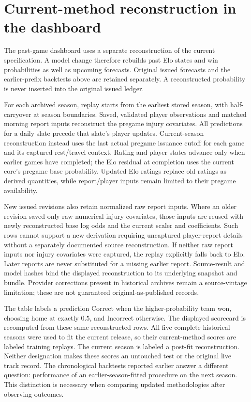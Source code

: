 \documentclass[11pt]{article}
\begin{document}
\section{Current-method reconstruction in the dashboard}
The past-game dashboard uses a separate reconstruction of the current
specification. A model change therefore rebuilds past Elo states and win
probabilities as well as upcoming forecasts. Original issued forecasts and
the earlier-prefix backtests above are retained separately. A reconstructed
probability is never inserted into the original issued ledger.

For each archived season, replay starts from the earliest stored season,
with half-carryover at season boundaries. Saved, validated player
observations and matched morning report inputs reconstruct the pregame
injury covariates. All predictions for a daily slate precede that slate's
player updates. Current-season reconstruction instead uses the last actual
pregame issuance cutoff for each game and its captured rest/travel context.
Rating and player states advance only when earlier games have completed;
the Elo residual at completion uses the current core's pregame base
probability. Updated Elo ratings replace old ratings as derived quantities,
while report/player inputs remain limited to their pregame availability.

New issued revisions also retain normalized raw report inputs. Where an
older revision saved only raw numerical injury covariates, those inputs
are reused with newly reconstructed base log odds and the current scaler
and coefficients. Such rows cannot support a new derivation requiring
uncaptured player-report details without a separately documented source
reconstruction. If neither raw report inputs nor injury covariates were
captured, the replay explicitly falls back to Elo. Later reports are never
substituted for a missing earlier report. Source-result and model hashes
bind the displayed reconstruction to its underlying snapshot and bundle.
Provider corrections present in historical archives remain a source-vintage
limitation; these are not guaranteed original-as-published records.

The table labels a prediction Correct when the higher-probability team
won, choosing home at exactly $0.5$, and Incorrect otherwise. The displayed
scorecard is recomputed from these same reconstructed rows. All five
complete historical seasons were used to fit the current release, so their
current-method scores are labeled training replays. The current season is
labeled a post-fit reconstruction. Neither designation makes these scores
an untouched test or the original live track record. The chronological
backtests reported earlier answer a different question: performance of an
earlier-season-fitted procedure on the next season. This distinction is
necessary when comparing updated methodologies after observing outcomes.
\end{document}
